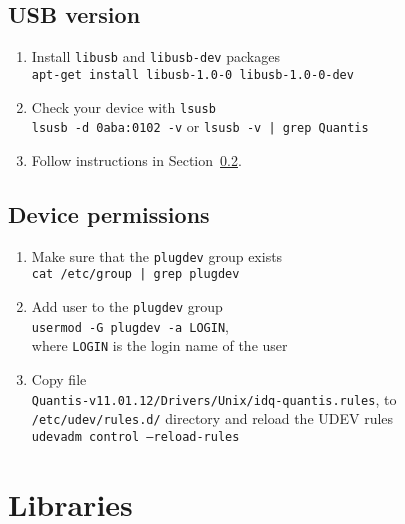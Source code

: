 \documentclass[a4paper]{scrartcl}
\begin{document}
\subsection{USB version}
\begin{enumerate}
    \item Install \texttt{libusb} and \texttt{libusb-dev} packages\\ 
    \texttt{apt-get install libusb-1.0-0 libusb-1.0-0-dev}
    \item Check your device with \texttt{lsusb}\\
    \texttt{lsusb -d 0aba:0102 -v} or \texttt{lsusb -v | grep Quantis}
    \item Follow instructions in Section~\ref{sec:permissions}.
\end{enumerate}


\subsection{Device permissions}\label{sec:permissions}
\begin{enumerate}
    \item Make sure that the \texttt{plugdev} group exists\\
    \texttt{cat /etc/group | grep plugdev}
    \item Add user to the \texttt{plugdev} group\\
    \texttt{usermod -G plugdev -a LOGIN},\\ where \texttt{LOGIN} is the login name of the user
    \item Copy file\\ \texttt{Quantis-v11.01.12/Drivers/Unix/idq-quantis.rules}, to \texttt{/etc/udev/rules.d/} directory and reload the UDEV rules\\
    \texttt{udevadm control --reload-rules}
\end{enumerate}

\section{Libraries}
\end{document}
